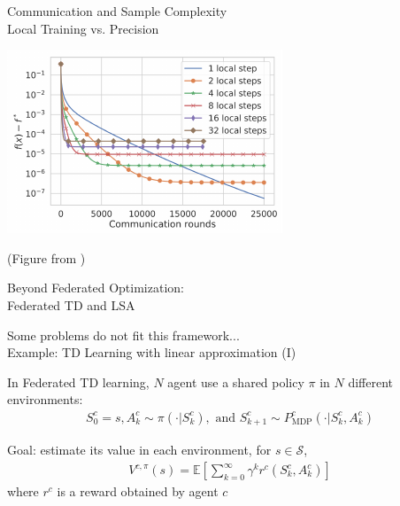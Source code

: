 \documentclass[aspectratio=169,14pt]{beamer}
\begin{document}

\begin{frame}{Communication and Sample Complexity\\[-0.5em]
    \large Local Training vs. Precision}
  
  \vspace{-1em}
  
  \begin{center}
    \includegraphics[width=0.6\linewidth]{images/comm-vs-local.pdf}
  \end{center}

  \vspace{-1em}

  \footnotesize
  (Figure from )
\end{frame}


\begin{frame}
  \begin{center}
    \textcolor{beamer@blendedblue}{
      \huge Beyond Federated Optimization:\\[0.5em]
      \huge Federated TD and LSA
    }
  \end{center}
\end{frame}


\begin{frame}{Some problems do not fit this framework...\\[-0.5em]
    \large Example: TD Learning with linear approximation (I)}

  In Federated TD learning, $N$ agent use a shared policy $\pi$ in $N$ different environments:
  \begin{align*}
    S_0^c= s, 
    A_k^c \sim \pi(\cdot | S_k^c), 
    \text{ and }
    S_{k+1}^c \sim P^c_{\text{MDP}}(\cdot| S_k^c,A_k^c)
  \end{align*}

  \pause
  
  Goal: estimate its value in each environment, for $s \in \mathcal{S}$,
  \begin{align*}
    V^{c,\pi}(s) = \textstyle{\mathbb{E}\left[\sum_{k=0}^{\infty}\gamma^{k} r^{c}(S_k^c,A_k^c)\right]}
  \end{align*}
  where $r^c$ is a reward obtained by agent $c$
\end{frame}
\end{document}
